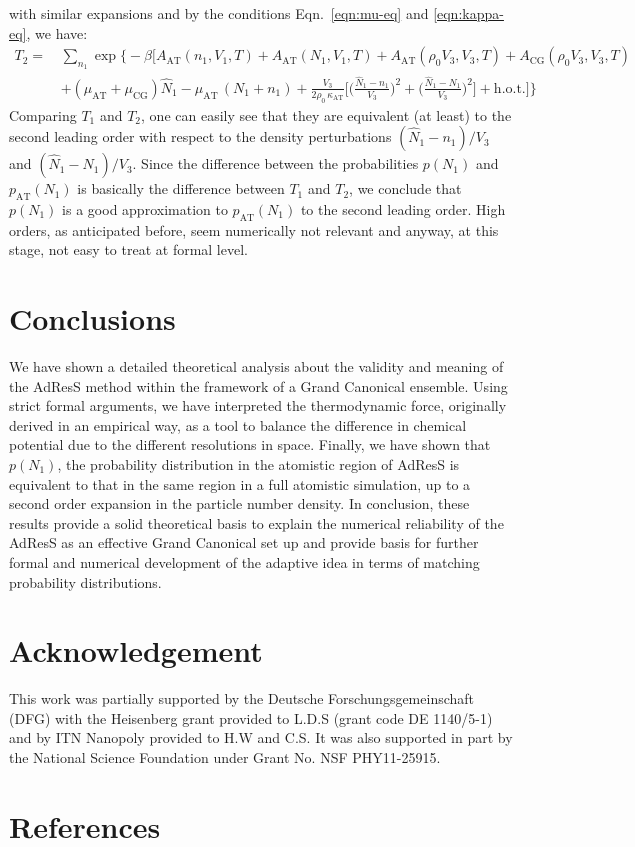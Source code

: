 \documentclass[aip,jcp,a4paper,reprint,onecolumn]{revtex4-1}
\newcommand{\AT}{{\textrm{{AT}}}}
\newcommand{\CG}{{\textrm{CG}}}
\begin{document}
with similar expansions and by the conditions Eqn.~\eqref{eqn:mu-eq}
and \eqref{eqn:kappa-eq}, we have:
\begin{align}\nonumber
  T_2
  = \,&
  \sum_{n_1}
  \exp
  \Big\{-\beta
  \Big[
  A_{\AT}(n_1,V_1,T) +
  A_{\AT}(N_1,V_1,T) +
  A_{\AT}(\rho_0V_3,V_3,T) +
  A_{\CG}(\rho_0V_3,V_3,T) \\
  \,&+(\mu_\AT + \mu_\CG)\hat N_1
  -\mu_{\AT}\,(N_1 + n_1) +
  \frac{V_3}{2\rho_0\, \kappa_{\AT}}
  \Big[
  \Big(
  \frac{\hat N_1 - n_1}{V_3}
  \Big)^2
  +
  \Big(
  \frac{\hat N_1 - N_1}{V_3}
  \Big)^2
  \Big]
  +\textrm{h.o.t.}
  \Big]
  \Big\}
\end{align}
Comparing $T_1$ and $T_2$, one can easily see that they are equivalent (at least) to the second leading
order with respect to the density perturbations
$(\hat N_1 - n_1)/{V_3}$
and $(\hat N_1 - N_1)/{V_3}$.
Since the difference between the probabilities
$p(N_1)$ and $p_{\AT}(N_1)$ is basically the difference between $T_1$
and $T_2$, we conclude that $p(N_1)$ is a good approximation to
$p_{\AT}(N_1)$ to the second leading order. High orders, as anticipated before, seem numerically not relevant and anyway, at this stage, not easy to treat at formal level.
\section{Conclusions}
We have shown a detailed theoretical analysis about the validity and meaning of the AdResS method within the framework of a Grand Canonical ensemble. Using strict formal arguments, we have interpreted the thermodynamic force, originally derived in an empirical way, as a tool to balance the difference in chemical potential due to the different resolutions in space. Finally, we have shown that $p(N_{1})$, the probability distribution in the atomistic region of AdResS is equivalent to that in the same region in a full atomistic simulation, up to a second order expansion in the particle number density. In conclusion, these results provide a solid theoretical basis to explain the numerical reliability of the AdResS as an effective Grand Canonical set up and provide basis for further formal and numerical development of the adaptive idea in terms of matching probability distributions.


\section*{Acknowledgement}
This work was partially supported by the Deutsche Forschungsgemeinschaft (DFG) with the Heisenberg grant provided to L.D.S (grant code DE 1140/5-1) and by ITN Nanopoly provided to H.W and C.S.
It was also supported in part by the National Science Foundation under Grant No. NSF PHY11-25915.
  
\section*{References}
{}

\end{document}
